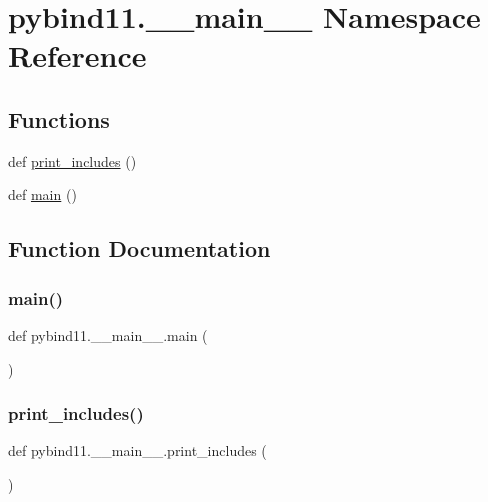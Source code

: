 \hypertarget{namespacepybind11_1_1____main____}{}\section{pybind11.\+\_\+\+\_\+main\+\_\+\+\_\+ Namespace Reference}
\label{namespacepybind11_1_1____main____}
\subsection*{Functions}
\begin{DoxyCompactItemize}
\item 
def \mbox{\hyperlink{namespacepybind11_1_1____main_____a4062123e470a1ca05ee10d30a6d18469}{print\+\_\+includes}} ()
\item 
def \mbox{\hyperlink{namespacepybind11_1_1____main_____a52c17c6403836cdf54441f7af087e631}{main}} ()
\end{DoxyCompactItemize}


\subsection{Function Documentation}
\mbox{\label{namespacepybind11_1_1____main_____a52c17c6403836cdf54441f7af087e631}} 
\subsubsection{\texorpdfstring{main()}{main()}}
{\footnotesize\ttfamily def pybind11.\+\_\+\+\_\+main\+\_\+\+\_\+.\+main (\begin{DoxyParamCaption}{ }\end{DoxyParamCaption})}

\mbox{\label{namespacepybind11_1_1____main_____a4062123e470a1ca05ee10d30a6d18469}} 
\subsubsection{\texorpdfstring{print\_includes()}{print\_includes()}}
{\footnotesize\ttfamily def pybind11.\+\_\+\+\_\+main\+\_\+\+\_\+.\+print\+\_\+includes (\begin{DoxyParamCaption}{ }\end{DoxyParamCaption})}

